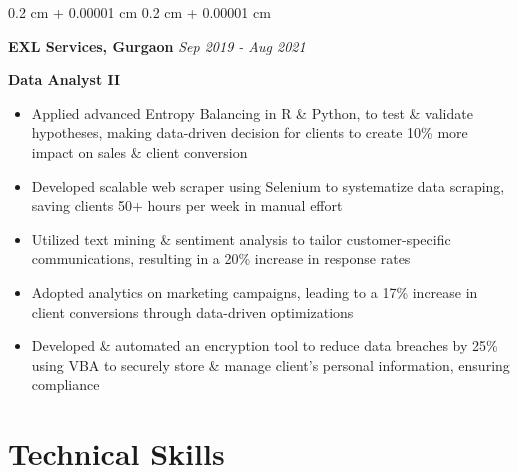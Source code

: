 \documentclass[10pt, letterpaper]{article}
\newenvironment{highlights}{
    \begin{itemize}[
        topsep=0.10 cm,
        parsep=0.10 cm,
        partopsep=0pt,
        itemsep=0pt,
        leftmargin=0.4 cm
    ]
}{
    \end{itemize}
} %
\newenvironment{onecolentry}{
    \begin{adjustwidth}{
        0.2 cm + 0.00001 cm
    }{
        0.2 cm + 0.00001 cm
    }
}{
    \end{adjustwidth}
} %
\begin{document}
        \vspace{0.6 cm}


        \begin{onecolentry}
        \fontsize{11 pt}{11 pt}
        \textbf{EXL Services, Gurgaon} \hfill \textit{Sep 2019 - Aug 2021}

            \fontsize{11 pt}{11 pt}
            \textbf{Data Analyst II}%
            \begin{highlights}
                \item	Applied advanced Entropy Balancing in R \& Python, to test \& validate hypotheses, making data-driven decision for clients to create 10\% more impact on sales \& client conversion
                \item	Developed scalable web scraper using Selenium to systematize data scraping, saving clients 50+ hours per week in manual effort
                
                \item	Utilized text mining \& sentiment analysis to tailor customer-specific communications, resulting in a 20\% increase in response rates %
                
                \item	Adopted analytics on marketing campaigns, leading to a 17\% increase in client conversions through data-driven optimizations
                
                \item	Developed \& automated an encryption tool to reduce data breaches by 25\% using VBA to securely store \& manage client’s personal information, ensuring compliance
                

            \end{highlights}
        \end{onecolentry}



    \section{Technical Skills}
\end{document}
